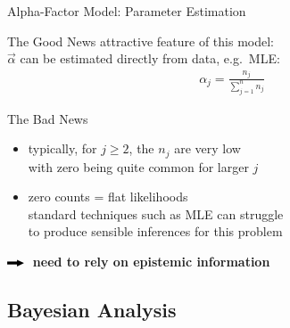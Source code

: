 \documentclass{beamer}
\def\then{{\color{lmugreen}$\rule[0.35ex]{2ex}{0.5ex}\!\!\!\blacktriangleright$}}
\begin{document}
\begin{frame}{Alpha-Factor Model: Parameter Estimation}
  \begin{exampleblock}{The Good News}
    attractive feature of this model: \\
    $\vec{\alpha}$ can be estimated directly from data, e.g.\ MLE:
    \begin{align*}
      \alpha_j=\frac{n_j}{\sum_{j=1}^n n_j}
    \end{align*}
  \end{exampleblock}
  \begin{alertblock}{The Bad News}
    \begin{itemize}
    \item typically, for $j\ge 2$, the $n_j$ are very low \\
      with zero being quite common for larger $j$
    \item zero counts = flat likelihoods \\
      standard techniques such as MLE can struggle \\
      to produce sensible inferences for this problem
    \end{itemize}
  \end{alertblock}
  \begin{center}
    \textbf{\then\ need to rely on \alert{epistemic information}}
  \end{center}
\end{frame}

\subsection{Bayesian Analysis}
\end{document}
